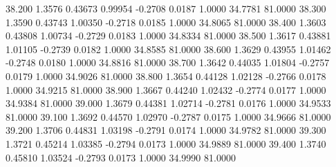   38.200   1.3576   0.43673   0.99954  -0.2708   0.0187   1.0000  34.7781  81.0000
  38.300   1.3590   0.43743   1.00350  -0.2718   0.0185   1.0000  34.8065  81.0000
  38.400   1.3603   0.43808   1.00734  -0.2729   0.0183   1.0000  34.8334  81.0000
  38.500   1.3617   0.43881   1.01105  -0.2739   0.0182   1.0000  34.8585  81.0000
  38.600   1.3629   0.43955   1.01462  -0.2748   0.0180   1.0000  34.8816  81.0000
  38.700   1.3642   0.44035   1.01804  -0.2757   0.0179   1.0000  34.9026  81.0000
  38.800   1.3654   0.44128   1.02128  -0.2766   0.0178   1.0000  34.9215  81.0000
  38.900   1.3667   0.44240   1.02432  -0.2774   0.0177   1.0000  34.9384  81.0000
  39.000   1.3679   0.44381   1.02714  -0.2781   0.0176   1.0000  34.9533  81.0000
  39.100   1.3692   0.44570   1.02970  -0.2787   0.0175   1.0000  34.9666  81.0000
  39.200   1.3706   0.44831   1.03198  -0.2791   0.0174   1.0000  34.9782  81.0000
  39.300   1.3721   0.45214   1.03385  -0.2794   0.0173   1.0000  34.9889  81.0000
  39.400   1.3740   0.45810   1.03524  -0.2793   0.0173   1.0000  34.9990  81.0000
